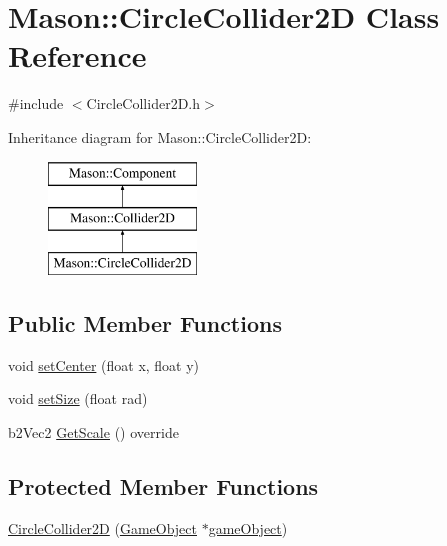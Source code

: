 \hypertarget{class_mason_1_1_circle_collider2_d}{}\section{Mason\+:\+:Circle\+Collider2D Class Reference}
\label{class_mason_1_1_circle_collider2_d}


{\ttfamily \#include $<$Circle\+Collider2\+D.\+h$>$}

Inheritance diagram for Mason\+:\+:Circle\+Collider2D\+:\begin{figure}[H]
\begin{center}
\leavevmode
\includegraphics[height=3.000000cm]{class_mason_1_1_circle_collider2_d}
\end{center}
\end{figure}
\subsection*{Public Member Functions}
\begin{DoxyCompactItemize}
\item 
void \hyperlink{class_mason_1_1_circle_collider2_d_aa0e943bbb6fb5b9f33110959a845ed76}{set\+Center} (float x, float y)
\item 
void \hyperlink{class_mason_1_1_circle_collider2_d_aa91dcf071566c9862cf1ac385ad9f4a9}{set\+Size} (float rad)
\item 
b2\+Vec2 \hyperlink{class_mason_1_1_circle_collider2_d_a4aa06f3ff8f00445a78f6b6a8b479ad0}{Get\+Scale} () override
\end{DoxyCompactItemize}
\subsection*{Protected Member Functions}
\begin{DoxyCompactItemize}
\item 
\hyperlink{class_mason_1_1_circle_collider2_d_ac713c4259ab552c74b291d0e17f0e98a}{Circle\+Collider2D} (\hyperlink{class_mason_1_1_game_object}{Game\+Object} $\ast$\hyperlink{class_mason_1_1_component_a30030370c35f5562cbbbb0927b0448c8}{game\+Object})
\end{DoxyCompactItemize}
